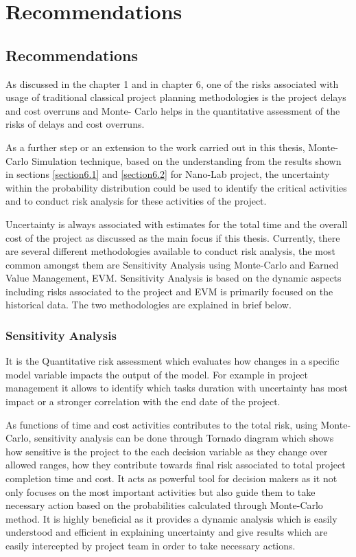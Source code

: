 \let\textcircled=\pgftextcircled
\chapter{Recommendations}
\section{Recommendations} 
As discussed in the chapter 1 and in chapter 6, one of the risks associated with usage of traditional classical project planning methodologies is the project delays and cost overruns and Monte- Carlo helps in the quantitative assessment of the risks of delays and cost overruns.

As a further step or an extension to the work carried out in this thesis, Monte-Carlo Simulation technique, based on the understanding from the results shown in sections \ref{section6.1} and \ref{section6.2} for Nano-Lab project, the uncertainty within the probability distribution could be used to identify the critical activities and to conduct risk analysis for these activities of the project.

Uncertainty is always associated with estimates for the total time and the overall cost of the project as discussed as the main focus if this thesis. Currently, there are several different methodologies available to conduct risk analysis, the most common amongst them are Sensitivity Analysis using Monte-Carlo and Earned Value Management, EVM. Sensitivity Analysis is based on the dynamic aspects including risks associated to the project and EVM is primarily focused on the historical data. The two methodologies are explained in brief below. 

\subsection{Sensitivity Analysis}

It is the Quantitative risk assessment\cite{Wood2002RiskST}  which evaluates how changes in a specific model variable impacts the output of the model. For example in project management it allows to identify which tasks duration with uncertainty has most impact or a stronger correlation with the end date of the project.

As functions of time and cost activities contributes to the total risk, using Monte-Carlo, sensitivity analysis can be done through Tornado diagram which shows how sensitive is the project to the each decision variable as they change over allowed ranges, how they contribute towards final risk associated to total project completion  time and cost. It acts as powerful tool for decision makers as it not only focuses on the most important activities but also guide them to take necessary action based on the probabilities calculated through Monte-Carlo method. It is highly beneficial as it provides a dynamic analysis which is easily understood and efficient in explaining uncertainty and give results which are easily intercepted by project team in order to take necessary actions.

